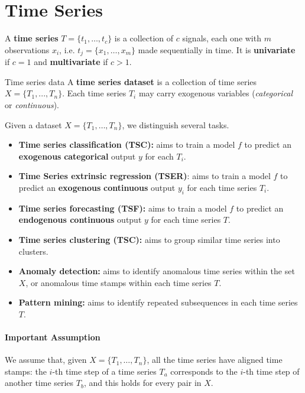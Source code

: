 \section{Time Series}
\begin{definition}
A \textbf{time series}  $T = \{t_1, \dots,t_c\}$ is a collection of $c$ signals, each one with $m$ observations $x_i$, i.e. $t_j = \{x_1, \dots, x_m\}$ made sequentially in time. It is \textbf{univariate} if $c = 1$ and  \textbf{multivariate} if $c > 1$.
\end{definition}

\begin{definition}
    {Time series data}
    A \textbf{time series dataset} is a collection of time series $X = \{T_1,...,T_n\}$. Each time series $T_i$ may carry exogenous variables (\textit{categorical} or \textit{continuous}).
\end{definition}
Given a dataset $X = \{T_1, \dots, T_n\}$, we distinguish several tasks.
\begin{itemize}
    \item \textbf{Time series classification (TSC):} aims to train a model $f$ to predict an \textbf{exogenous} \textbf{categorical} output $y$ for each $T_i$.
    \item \textbf{Time Series extrinsic regression (TSER)}: aims to train a model $f$ to predict an \textbf{exogenous} \textbf{continuous} output $y_i$ for each time series $T_i$.
    \item \textbf{Time series forecasting (TSF):} aims to train a model $f$ to predict an \textbf{endogenous continuous} output $y$ for each time series $T$.
    \item \textbf{Time series clustering (TSC):} aims to group similar time series into clusters.
    \item \textbf{Anomaly detection:} aims to identify anomalous time series within the set $X$, or anomalous time stamps within each time series $T$.
    \item \textbf{Pattern mining:} aims to identify repeated subsequences in each time series $T$.
\end{itemize}

\paragraph{Important Assumption} We assume that, given $X= \{T_1, \dots, T_n\}$, all the time series have aligned time stamps: the $i$-th time step of a time series $T_a$ corresponds to the $i$-th time step of another time series $T_b$, and this holds for every pair in $X$.

